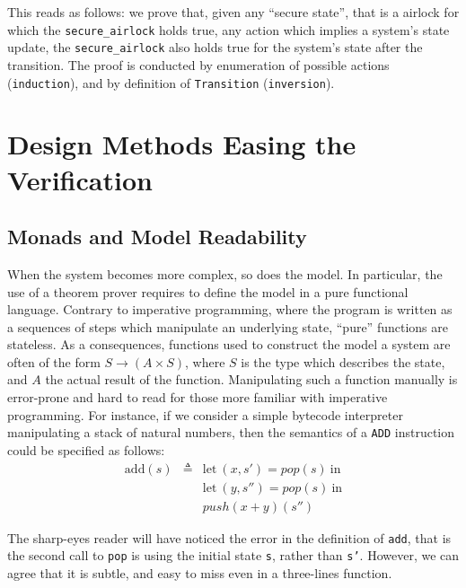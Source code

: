 \begin{example}
  \inputminted[frame=single]{coq}{Listings/Airlock4.v}

  This reads as follows: we prove that, given any ``secure state'', that is a
  airlock for which the \texttt{secure\_airlock} holds true, any action which
  implies a system's state update, the \texttt{secure\_airlock} also holds true
  for the system's state after the transition.
  The proof is conducted by enumeration of possible actions
  (\texttt{induction}), and by definition of \texttt{Transition}
  (\texttt{inversion}).
\end{example}

\section{Design Methods Easing the Verification}
\label{sec:related:ease}

\subsection{Monads and Model Readability}

When the system becomes more complex, so does the model.
%
In particular, the use of a theorem prover requires to define the model in a
pure functional language.
%
Contrary to imperative programming, where the program is written as a sequences
of steps which manipulate an underlying state, ``pure'' functions are stateless.
%
As a consequences, functions used to construct the model a system are often of
the form $S \rightarrow (A \times S)$, where $S$ is the type which describes the
state, and $A$ the actual result of the function.
%
Manipulating such a function manually is error-prone and hard to read for those
more familiar with imperative programming.
%
For instance, if we consider a simple bytecode interpreter manipulating a stack
of natural numbers, then the semantics of a \texttt{ADD} instruction could be
specified as follows:
%
\[\begin{array}{rcl}
    \mathrm{add}(s) &\triangleq& \mathrm{let\ }(x, s') = pop(s) \mathrm{\ in} \\
                    &          & \mathrm{let\ }(y, s'') = pop(s) \mathrm{\ in} \\
                    &          & push(x + y)(s'')
  \end{array}\]

The sharp-eyes reader will have noticed the error in the definition of
\texttt{add}, that is the second call to \texttt{pop} is using the initial state
\texttt{s}, rather than \texttt{s'}.
%
However, we can agree that it is subtle, and easy to miss even in a three-lines
function.

